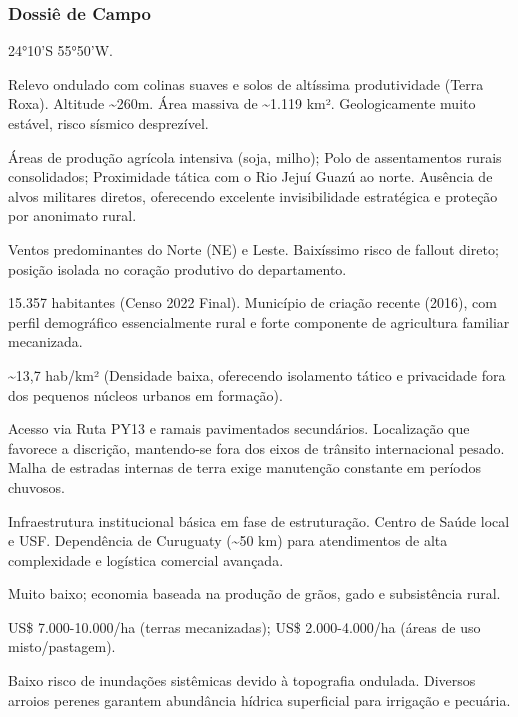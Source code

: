 \subsubsection{Dossiê de Campo}
\begin{description}[style=nextline,leftmargin=0.5cm,font=\bfseries]
\item[Coordenadas]  24°10'S 55°50'W.
\item[Topografia]  Relevo ondulado com colinas suaves e solos de altíssima produtividade (Terra Roxa). Altitude \textasciitilde 260m. Área massiva de \textasciitilde 1.119 km². Geologicamente muito estável, risco sísmico desprezível.
\item[Alvos Estratégicos]  Áreas de produção agrícola intensiva (soja, milho); Polo de assentamentos rurais consolidados; Proximidade tática com o Rio Jejuí Guazú ao norte. Ausência de alvos militares diretos, oferecendo excelente invisibilidade estratégica e proteção por anonimato rural.
\item[Fallout]  Ventos predominantes do Norte (NE) e Leste. Baixíssimo risco de fallout direto; posição isolada no coração produtivo do departamento.
\item[População]  15.357 habitantes (Censo 2022 Final). Município de criação recente (2016), com perfil demográfico essencialmente rural e forte componente de agricultura familiar mecanizada.
\item[Densidade]  \textasciitilde 13,7 hab/\allowbreak km² (Densidade baixa, oferecendo isolamento tático e privacidade fora dos pequenos núcleos urbanos em formação).
\item[Vias de Acesso]  Acesso via Ruta PY13 e ramais pavimentados secundários. Localização que favorece a discrição, mantendo-se fora dos eixos de trânsito internacional pesado. Malha de estradas internas de terra exige manutenção constante em períodos chuvosos.
\item[Serviços]  Infraestrutura institucional básica em fase de estruturação. Centro de Saúde local e USF. Dependência de Curuguaty (\textasciitilde 50 km) para atendimentos de alta complexidade e logística comercial avançada.
\item[Custo de Vida]  Muito baixo; economia baseada na produção de grãos, gado e subsistência rural.
\item[Preço da Terra]  US\$ 7.000-10.000/\allowbreak ha (terras mecanizadas); US\$ 2.000-4.000/\allowbreak ha (áreas de uso misto/\allowbreak pastagem).
\item[Hidrologia]  Baixo risco de inundações sistêmicas devido à topografia ondulada. Diversos arroios perenes garantem abundância hídrica superficial para irrigação e pecuária.

\end{description}
